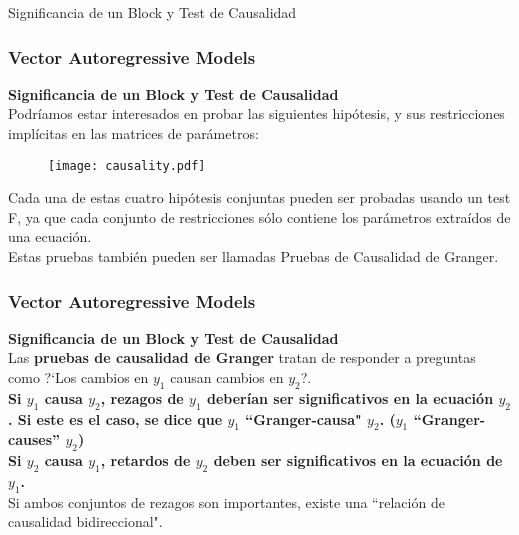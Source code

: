 \documentclass[spanish,xcolor=table]{beamer}
\begin{document}
\begin{section}{Significancia de un Block y Test de Causalidad}
\begin{frame}
\end{frame}
\begin{frame}
\frametitle{Vector Autoregressive Models}
\textbf{Significancia de un Block y Test de Causalidad}\\

Podr\'{i}amos estar interesados en probar las siguientes hip\'otesis, y sus restricciones impl\'{i}citas en las matrices de par\'ametros:\\
\begin{figure}[t!]
\texttt{[image: causality.pdf]}
\end{figure}

Cada una de estas cuatro hip\'otesis conjuntas pueden ser probadas usando un test F, ya que cada conjunto de restricciones s\'olo contiene los par\'ametros extra\'{i}dos de una ecuaci\'on.\\

Estas pruebas tambi\'en pueden ser llamadas Pruebas de Causalidad de Granger.\\

\end{frame}
\begin{frame}
\frametitle{Vector Autoregressive Models}

\textbf{Significancia de un Block y Test de Causalidad}\\
Las \textbf{pruebas de causalidad de Granger} tratan de responder a preguntas como ?`Los cambios en $y_1$ causan cambios en $y_2$?.\\
\textbf{Si $y_1$ causa $y_2$, rezagos de $y_1$ deber\'{i}an ser significativos en la ecuaci\'on $y_2$. Si este es el caso, se dice que $y_1$ ``Granger-causa" $y_2$. ($y_1$ ``Granger-causes” $y_2$)}\\

\textbf{Si $y_2$ causa $y_1$, retardos de $y_2$ deben ser significativos en la ecuaci\'on de $y_1$.}\\

Si ambos conjuntos de rezagos son importantes, existe una ``relaci\'on de causalidad bidireccional".\\

\end{frame}
\end{section}
\end{document}

